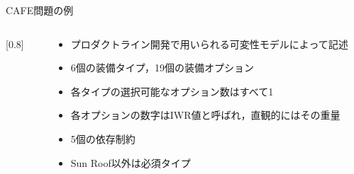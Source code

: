 \documentclass[dvipdfmx, 11pt]{beamer}
\begin{document}
\begin{frame}{CAFE問題の例}
  \begin{columns}
    \begin{column}{0.75\linewidth}
      \scalebox{0.8}[0.8]{}
    \end{column}
    \begin{column}{0.25\linewidth}
      \begin{footnotesize}
        \begin{itemize}
        \item プロダクトライン開発で用いられる可変性モデルによって記述
        \item 6個の装備タイプ，19個の装備オプション
        \item 各タイプの選択可能なオプション数はすべて1
        \item 各オプションの数字はIWR値と呼ばれ，直観的にはその重量
        \item 5個の依存制約
        \item \textsf{Sun Roof}以外は必須タイプ
        \end{itemize}
      \end{footnotesize}
    \end{column}
  \end{columns}
\end{frame}
\end{document}
